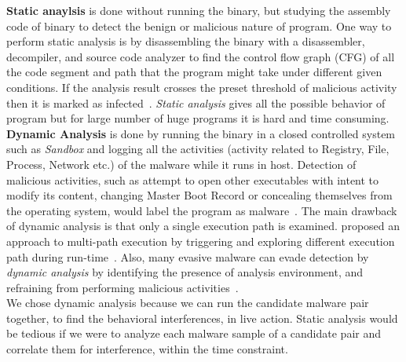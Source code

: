 \textbf{Static anaylsis} is done without running the binary, but studying the assembly code of binary to detect the benign or malicious nature of program.
One way to perform static analysis is by disassembling the binary with a disassembler, decompiler, and source code analyzer to find the control flow graph (CFG) of all the code segment and path that the program might take under different given conditions.
If the analysis result crosses the preset threshold of malicious activity then it is marked as infected~\cite[]{sharma2014}.
\emph{Static analysis} gives all the possible behavior of program but for large number of huge programs it is hard and time consuming.\\

\textbf{Dynamic Analysis} is done by running the binary in a closed controlled system such as \emph{Sandbox} and logging all the activities (activity related to Registry, File, Process, Network etc.) of the malware while it runs in host.
Detection of malicious activities, such as attempt to open other executables with intent to modify its content, changing Master Boot Record or concealing themselves from the operating system, would label the program as malware~\cite[]{sharma2014}.
The main drawback of dynamic analysis is that only a single execution path is examined.
\citeauthor{chipounov2012s2e} proposed an approach to multi-path execution by triggering and exploring different execution path during run-time~\cite[]{chipounov2012s2e}.
Also, many evasive malware can evade detection by \emph{dynamic analysis} by identifying the presence of analysis environment, and refraining from performing malicious activities~\cite[]{barecloud}.
\\

We chose dynamic analysis because we can run the candidate malware pair together, to find the behavioral interferences, in live action.
Static analysis would be tedious if we were to analyze each malware sample of a candidate pair and correlate them for interference, within the time constraint.
